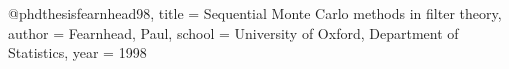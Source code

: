 @phdthesis{fearnhead98,
  title  = {{S}equential {M}onte {C}arlo methods in filter theory},
  author = {Fearnhead, Paul},
  school = {University of Oxford, Department of Statistics},
  year   = {1998}
}

